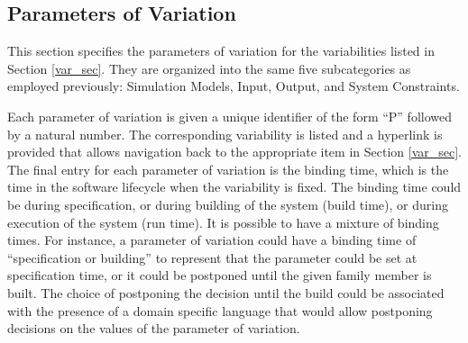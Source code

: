 \documentclass[12pt, notitlepage]{article}
\begin{document}
\newpage
\subsection{Parameters of Variation}
This section specifies the parameters of variation for the variabilities listed in Section \ref{var_sec}. They are organized into the same five subcategories as employed previously: Simulation Models, Input, Output, and System Constraints. 

Each parameter of variation is given a unique identifier of the form “P” followed by a natural number. The corresponding variability is listed and a hyperlink is provided that allows navigation back to the appropriate item in Section \ref{var_sec}. The final entry for each parameter of variation is the binding time, which is the time in the software lifecycle when the variability is fixed. The binding time could be during specification, or during building
of the system (build time), or during execution of the system (run time). It is possible to have a mixture of binding times. For instance, a parameter of variation could have a binding time of “specification or building” to represent that the parameter could be set at specification time, or it could be postponed until the given family member is built. The choice of postponing the decision until the build could be associated with the presence of a domain specific language that would allow postponing decisions on the values of the parameter of variation.
\end{document}
